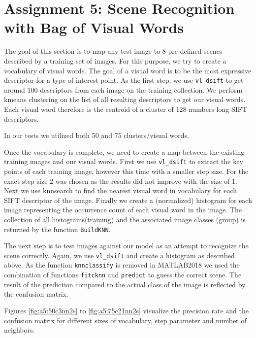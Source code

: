 \section{Assignment 5: Scene Recognition with Bag of Visual Words}

The goal of this section is to map any test image to 8 pre-defined scenes described by a training set of images. For this purpose, we try to create a vocabulary of visual words. The goal of a visual word is to be the most expressive descriptor for a type of interest point. As the first step, we use \texttt{vl\_dsift} to get around 100 descriptors from each image on the training collection. We perform k\-means clustering on the list of all resulting descriptors to get our visual words. Each visual word therefore is the centroid of a cluster of 128 numbers long SIFT descriptors.


In our tests we utilized both 50 and 75 clusters/visual words.


Once the vocabulary is complete, we need to create a map between the existing training images and our visual words. First we use \texttt{vl\_dsift} to extract the key points of each training image, however this time with a smaller step size. For the exact step size 2 was chosen as the results did not improve with the size of 1. Next we use knnsearch to find the nearest visual word in vocabulary for each SIFT descriptor of the image. Finally we create a (normalized) histogram for each image representing the occurrence count of each visual word in the image. The collection of all histograms(training) and the associated image classes (group) is returned by the function \texttt{BuildKNN}.


The next step is to test images against our model as an attempt to recognize the scene correctly. Again, we use \texttt{vl\_dsift} and create a histogram as described above. As the function \texttt{knnclassify} is removed in MATLAB2018 we used the combination of functions \texttt{fitcknn} and \texttt{predict} to guess the correct scene. The result of the prediction compared to the actual class of the image is reflected by the confusion matrix.

Figures \ref{fig:a5:50c3nn2s} to \ref{fig:a5:75c21nn2s} visualize the precision rate and the confusion matrix for different sizes of vocabulary, step parameter and number of neighbors.


